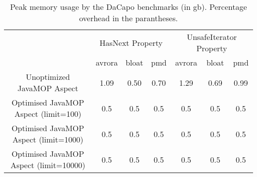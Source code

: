 \begin{table*}[ht]
\centering
\scriptsize
\begin{tabular}{|c|c|c|c|c|c|c|}
\hline
  \multirow{2}{*}{}                                 & 
\multicolumn{3}{c|}{HasNext Property}           & \multicolumn{3}{c|}{UnsafeIterator Property}       
      \\ \cline{2-7}                                              
                    & avrora           & bloat         & pmd      & avrora       
    & bloat         & pmd \\ \hline
Unoptimized JavaMOP Aspect     & 1.09 & 0.50 & 0.70  & 1.29 & 0.69 & 0.99 \\ 
\hline
Optimised JavaMOP Aspect (limit=100)   & 0.5  & 0.5  & 0.5   & 0.5  & 0.5  & 0.5 
  \\ \hline
Optimised JavaMOP Aspect (limit=1000)   & 0.5  & 0.5  & 0.5   & 0.5  & 0.5  & 
0.5   \\ \hline
Optimised JavaMOP Aspect (limit=10000)   & 0.5  & 0.5  & 0.5   & 0.5  & 0.5  & 
0.5   \\ \hline
\end{tabular}
\caption{Peak memory usage by the DaCapo benchmarks (in gb). Percentage overhead
in the parantheses.}
\end{table*}
\label{table:runtimeoverhead}

